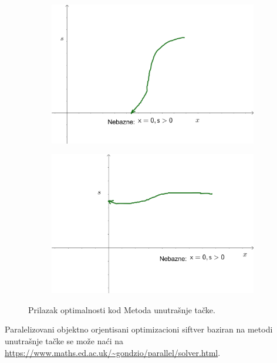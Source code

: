 \documentclass[a4paper, utf8, 11pt, colorlinks]{book}
\begin{document}
\begin{figure}
	\centering
	\begin{subfigure}{.45\textwidth}
	\centering
	\includegraphics[width=.9\linewidth]{interior-3}  
\end{subfigure}
\begin{subfigure}{.45\textwidth}
	\centering
	\includegraphics[width=.9\linewidth]{interior-4}  
\end{subfigure}
  \caption{Prilazak optimalnosti kod Metoda unutrašnje tačke.}
   \label{fig:optimality-approaching-interior}
\end{figure}
Paralelizovani objektno orjentisani optimizacioni siftver baziran na metodi unutrašnje tačke se može naći na 
\url{https://www.maths.ed.ac.uk/~gondzio/parallel/solver.html}.  \\
\end{document}
